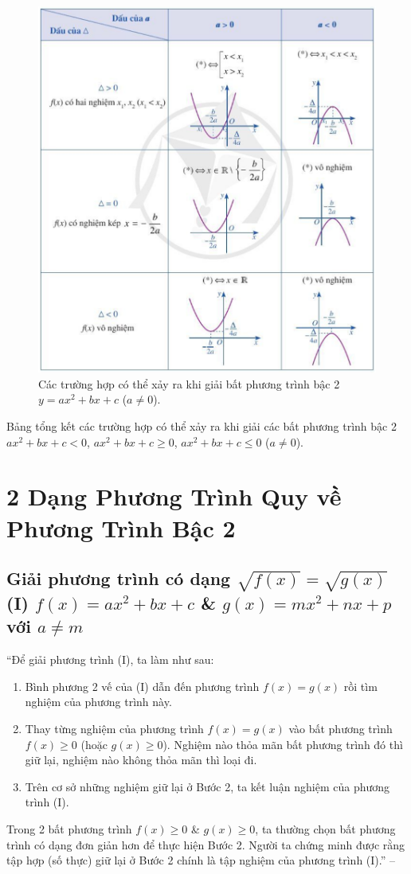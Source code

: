 \documentclass[oneside]{book}
\numberwithin{equation}{section}
\begin{document}
\begin{figure}[H]
	\centering
	\includegraphics[scale=0.35]{bat_phuong_trinh_bac_2}
	\caption{Các trường hợp có thể xảy ra khi giải bất phương trình bậc 2 $y = ax^2 + bx + c$ ($a\ne 0$).}
\end{figure}
Bảng tổng kết các trường hợp có thể xảy ra khi giải các bất phương trình bậc 2 $ax^2 + bx + c < 0$, $ax^2 + bx + c\ge 0$, $ax^2 + bx + c\le 0$ ($a\ne 0$).

\section{2 Dạng Phương Trình Quy về Phương Trình Bậc 2}

\subsection{Giải phương trình có dạng $\sqrt{f(x)} = \sqrt{g(x)}$ (I) $f(x) = ax^2 + bx + c$ \& $g(x) = mx^2 + nx + p$ với $a\ne m$}
``Để giải phương trình (I), ta làm như sau:
\begin{enumerate}
	\item Bình phương 2 vế của (I) dẫn đến phương trình $f(x) = g(x)$ rồi tìm nghiệm của phương trình này.
	\item Thay từng nghiệm của phương trình $f(x) = g(x)$ vào bất phương trình $f(x)\ge 0$ (hoặc $g(x)\ge 0$). Nghiệm nào thỏa mãn bất phương trình đó thì giữ lại, nghiệm nào không thỏa mãn thì loại đi.
	\item Trên cơ sở những nghiệm giữ lại ở Bước 2, ta kết luận nghiệm của phương trình (I).
\end{enumerate}
Trong 2 bất phương trình $f(x)\ge 0$ \& $g(x)\ge 0$, ta thường chọn bất phương trình có dạng đơn giản hơn để thực hiện Bước 2. Người ta chứng minh được rằng tập hợp (số thực) giữ lại ở Bước 2 chính là tập nghiệm của phương trình (I).'' -- \cite[p. 56]{SGK_Toan_10_Canh_Dieu_tap_1}
\end{document}
